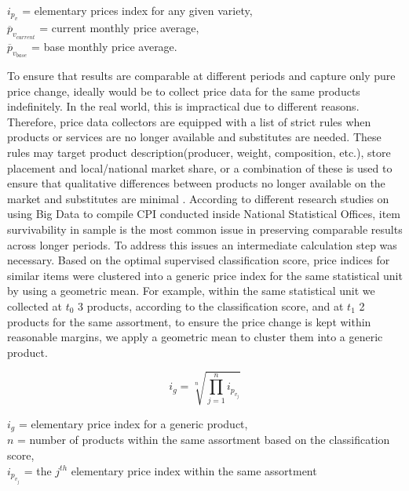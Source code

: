 \documentclass[]{article}
\begin{document}
\begin{center}	
	$i_{p_{v}}$ = elementary prices index for any given variety, \\
	$\overline{p}_{v_{current}}$ = current monthly price average, \\
	$\overline{p}_{v_{base}}$ = base monthly price average.
\end{center} 

To ensure that results are comparable at different periods and capture only pure price change, ideally would be to collect price data for the same products indefinitely\cite{cpi2}. In the real world, this is impractical due to different reasons. Therefore, price data collectors are equipped with a list of strict rules when products or services are no longer available and substitutes are needed. These rules may target product description(producer, weight, composition, etc.), store placement and local/national market share, or a combination of these is used to ensure that qualitative differences between products no longer available on the market and substitutes are minimal \cite{cpi}. According to different research studies on using Big Data to compile CPI conducted inside National Statistical Offices, item survivability in sample is the most common issue in preserving comparable results across longer periods\cite{ons2017, willenborg2017, tranzitivity, kints}. To address this issues an intermediate calculation step was necessary. Based on the optimal supervised classification score, price indices for similar items were clustered into a generic price index for the same statistical unit by using a geometric mean. For example, within the same statistical unit we collected at $t_{0}$ 3 products, according to the classification score, and at $t_{1}$ 2 products for the same assortment, to ensure the price change is kept within reasonable margins, we apply a geometric mean to cluster them into a generic product.   

\begin{equation}\label{eq:3}
i_{g} = \sqrt[n]{\prod_{j=1}^{n} i_{p_{v_{j}}}}
\end{equation}

\begin{center}
	$i_{g}$ = elementary price index for a generic product, \\
	$n$ = number of products within the same assortment based on the classification score, \\
	$i_{p_{v_{j}}}$ = the $j^{th}$ elementary price index within the same assortment
\end{center}
\end{document}
